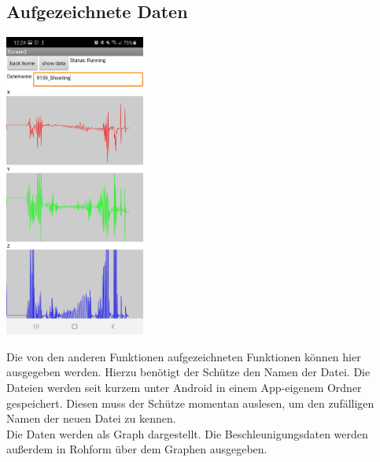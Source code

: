\subsection{Aufgezeichnete Daten}
    \begin{minipage}{0.5\textwidth}
        \includegraphics[height=10cm]{Bilder/GraphRec.jpg}
    \end{minipage}
    \hfill
    \begin{minipage}{0.5\textwidth}
        Die von den anderen Funktionen aufgezeichneten Funktionen können hier ausgegeben
        werden. Hierzu benötigt der Schütze den Namen der Datei. Die Dateien werden
        seit kurzem unter Android in einem App-eigenem Ordner gespeichert. Diesen muss
        der Schütze momentan auslesen, um den zufälligen Namen der neuen Datei zu kennen.\\
        Die Daten werden als Graph dargestellt. Die Beschleunigungsdaten werden außerdem
        in Rohform über dem Graphen ausgegeben.\\
    \end{minipage}
